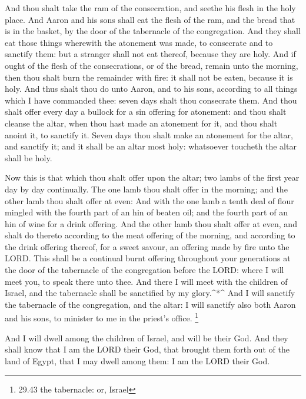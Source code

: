  And thou shalt take the ram of the consecration, and
seethe his flesh in the holy place.  And Aaron and his sons
shall eat the flesh of the ram, and the bread that is in the basket, by
the door of the tabernacle of the congregation.  And they
shall eat those things wherewith the atonement was made, to consecrate
and to sanctify them: but a stranger shall not eat thereof, because they
are holy.  And if ought of the flesh of the consecrations,
or of the bread, remain unto the morning, then thou shalt burn the
remainder with fire: it shall not be eaten, because it is holy.
 And thus shalt thou do unto Aaron, and to his sons,
according to all things which I have commanded thee: seven days shalt
thou consecrate them.  And thou shalt offer every day a
bullock for a sin offering for atonement: and thou shalt cleanse the
altar, when thou hast made an atonement for it, and thou shalt anoint
it, to sanctify it.  Seven days thou shalt make an
atonement for the altar, and sanctify it; and it shall be an altar most
holy: whatsoever toucheth the altar shall be holy.

 Now this is that which thou shalt offer upon the altar;
two lambs of the first year day by day continually.  The
one lamb thou shalt offer in the morning; and the other lamb thou shalt
offer at even:  And with the one lamb a tenth deal of flour
mingled with the fourth part of an hin of beaten oil; and the fourth
part of an hin of wine for a drink offering.  And the other
lamb thou shalt offer at even, and shalt do thereto according to the
meat offering of the morning, and according to the drink offering
thereof, for a sweet savour, an offering made by fire unto the LORD.
 This shall be a continual burnt offering throughout your
generations at the door of the tabernacle of the congregation before the
LORD: where I will meet you, to speak there unto thee.  And
there I will meet with the children of Israel, and the tabernacle shall
be sanctified by my glory.\^{}*\^{}  And I will sanctify
the tabernacle of the congregation, and the altar: I will sanctify also
both Aaron and his sons, to minister to me in the priest's office.
\footnote{29.43 the tabernacle: or, Israel}

 And I will dwell among the children of Israel, and will be
their God.  And they shall know that I am the LORD their
God, that brought them forth out of the land of Egypt, that I may dwell
among them: I am the LORD their God.

